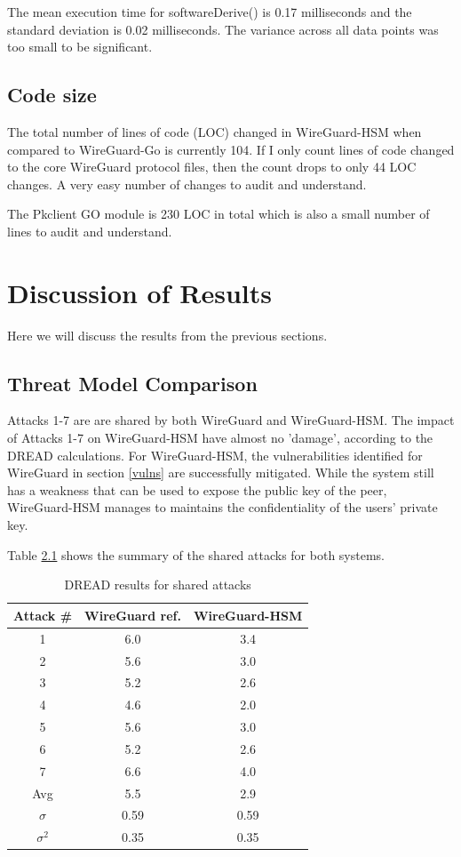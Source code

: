 \documentclass [11pt, proquest] {uwthesis}[2020/02/24]
\begin{document}
The mean execution time for softwareDerive() is 0.17 milliseconds and the standard deviation is 0.02 milliseconds. The variance across all data points was too small to be significant.

\section{Code size}
\label{loc}
The total number of lines of code (LOC) changed in WireGuard-HSM when compared to WireGuard-Go is currently 104. If I only count lines of code changed to the core WireGuard protocol files, then the count drops to only 44 LOC changes. A very easy number of changes to audit and understand.

The Pkclient GO module is 230 LOC in total which is also a small number of lines to audit and understand.

\chapter {Discussion of Results}
Here we will discuss the results from the previous sections.

\section{Threat Model Comparison}
Attacks 1-7 are are shared by both WireGuard and WireGuard-HSM. The impact of Attacks 1-7 on WireGuard-HSM have almost no 'damage', according to the DREAD calculations. For WireGuard-HSM, the vulnerabilities identified for WireGuard in section \ref{vulns} are successfully mitigated. While the system still has a weakness that can be used to expose the public key of the peer, WireGuard-HSM manages to maintains the confidentiality of the users' private key.

Table \ref{tab:DREAD_AVG} shows the summary of the shared attacks for both systems.

\begin{table}[H]
  \begin{center}
    \caption{DREAD results for shared attacks}
    \label{tab:DREAD_AVG}
    \begin{tabular}{c|c|c}
      \textbf{Attack \#} & \textbf{WireGuard ref.} & \textbf{WireGuard-HSM}\\
      \hline
      1 & 6.0 & 3.4\\
      2 & 5.6 & 3.0\\
      3 & 5.2 & 2.6\\
      4 & 4.6 & 2.0\\
      5 & 5.6 & 3.0\\
      6 & 5.2 & 2.6\\
      7 & 6.6 & 4.0\\
    \hline
    Avg & 5.5 & 2.9\\
    $\sigma$ &  0.59 & 0.59\\
    $\sigma^2$ &  0.35 & 0.35\\
    \end{tabular}
  \end{center}
\end{table}
\end{document}
